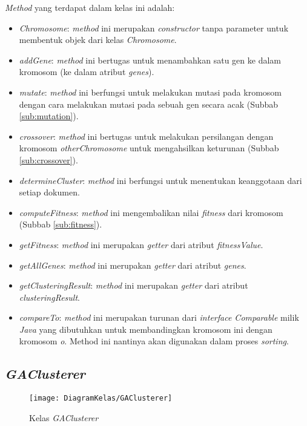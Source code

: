 \textit{Method} yang terdapat dalam kelas ini adalah:

\begin{itemize}
	\item \textit{Chromosome}: \textit{method} ini merupakan \textit{constructor} tanpa parameter untuk membentuk objek dari kelas \textit{Chromosome}.
	\item \textit{addGene}: \textit{method} ini bertugas untuk menambahkan satu gen ke dalam kromosom (ke dalam atribut \textit{genes}).
	\item \textit{mutate}: \textit{method} ini berfungsi untuk melakukan mutasi pada kromosom dengan cara melakukan mutasi pada sebuah gen secara acak (Subbab \ref{sub:mutation}).
	\item \textit{crossover}: \textit{method} ini bertugas untuk melakukan persilangan dengan kromosom \textit{otherChromosome} untuk mengahsilkan keturunan (Subbab \ref{sub:crossover}).
	\item \textit{determineCluster}: \textit{method} ini berfungsi untuk menentukan keanggotaan dari setiap dokumen.
	\item \textit{computeFitness}: \textit{method} ini mengembalikan nilai \textit{fitness} dari kromosom (Subbab \ref{sub:fitness}).
	\item \textit{getFitness}: \textit{method} ini merupakan \textit{getter} dari atribut \textit{fitnessValue}.
	\item \textit{getAllGenes}: \textit{method} ini merupakan \textit{getter} dari atribut \textit{genes}.
	\item \textit{getClusteringResult}: \textit{method} ini merupakan \textit{getter} dari atribut \textit{clusteringResult}.
	\item \textit{compareTo}: \textit{method} ini merupakan turunan dari \textit{interface Comparable} milik \textit{Java} yang dibutuhkan untuk membandingkan kromosom ini dengan kromosom \textit{o}. Method ini nantinya akan digunakan dalam proses \textit{sorting}.
\end{itemize}

\subsection{\textit{GAClusterer}}

\begin{figure}[H]
	\begin{center}
		\texttt{[image: DiagramKelas/GAClusterer]}
		\caption{Kelas \textit{GAClusterer}}
		\label{fig:kelasGAClusterer}
	\end{center}
\end{figure}

